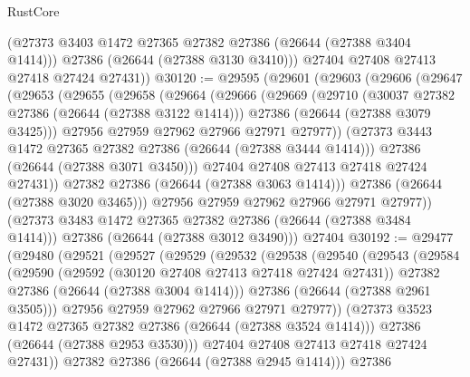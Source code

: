 \begin{lexlean}{RustCore}
\begin{coremodule}
          (@27373 @3403 @1472 @27365 @27382 @27386 (@26644 (@27388 @3404 @1414)))
          @27386
          (@26644 (@27388 @3130 @3410)))
        @27404
        @27408
        @27413
        @27418
        @27424
        @27431))
@30120 := @29595
    (@29601
      (@29603
        (@29606
          (@29647
            (@29653
              (@29655
                (@29658
                  (@29664
                    (@29666
                      (@29669
                        (@29710
                          (@30037 @27382 @27386 (@26644 (@27388 @3122 @1414)))
                          @27386
                          (@26644 (@27388 @3079 @3425)))
                        @27956
                        @27959
                        @27962
                        @27966
                        @27971
                        @27977))
                    (@27373 @3443 @1472 @27365 @27382 @27386 (@26644 (@27388 @3444 @1414)))
                    @27386
                    (@26644 (@27388 @3071 @3450)))
                  @27404
                  @27408
                  @27413
                  @27418
                  @27424
                  @27431))
              @27382
              @27386
              (@26644 (@27388 @3063 @1414)))
            @27386
            (@26644 (@27388 @3020 @3465)))
          @27956
          @27959
          @27962
          @27966
          @27971
          @27977))
      (@27373 @3483 @1472 @27365 @27382 @27386 (@26644 (@27388 @3484 @1414)))
      @27386
      (@26644 (@27388 @3012 @3490)))
    @27404
@30192 := @29477
    (@29480
      (@29521
        (@29527
          (@29529
            (@29532
              (@29538
                (@29540
                  (@29543
                    (@29584
                      (@29590
                        (@29592 (@30120 @27408 @27413 @27418 @27424 @27431))
                        @27382
                        @27386
                        (@26644 (@27388 @3004 @1414)))
                      @27386
                      (@26644 (@27388 @2961 @3505)))
                    @27956
                    @27959
                    @27962
                    @27966
                    @27971
                    @27977))
                (@27373 @3523 @1472 @27365 @27382 @27386 (@26644 (@27388 @3524 @1414)))
                @27386
                (@26644 (@27388 @2953 @3530)))
              @27404
              @27408
              @27413
              @27418
              @27424
              @27431))
          @27382
          @27386
          (@26644 (@27388 @2945 @1414)))
        @27386

\end{coremodule}
\end{lexlean}
